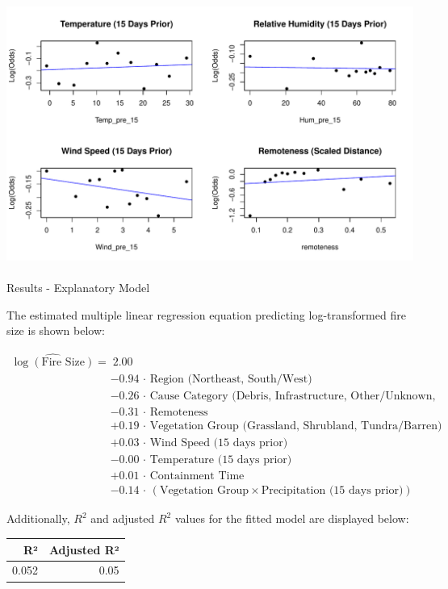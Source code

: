 \documentclass[
  letterpaper,
  DIV=11,
  numbers=noendperiod]{scrartcl}
\makeatletter
\let\oldparagraph\paragraph
\renewcommand{\paragraph}{
    \@ifstar
      \xxxParagraphStar
      \xxxParagraphNoStar
  }
\newcommand{\xxxParagraphStar}[1]{\oldparagraph*{#1}\mbox{}}
\newcommand{\xxxParagraphNoStar}[1]{\oldparagraph{#1}\mbox{}}
\makeatother
\begin{document}
\includegraphics{written-report_files/figure-pdf/unnamed-chunk-15-1.pdf}

\paragraph{Results - Explanatory
Model}\label{results---explanatory-model}

The estimated multiple linear regression equation predicting
log-transformed fire size is shown below:

\[
\begin{aligned}
\widehat{\log(\text{Fire Size})} =\ &\ 2.00 \\
&- 0.94\,\cdot\,\text{Region (Northeast, South/West)} \\
&- 0.26\,\cdot\,\text{Cause Category (Debris, Infrastructure, Other/Unknown, Recreational)} \\
&- 0.31\,\cdot\,\text{Remoteness} \\
&+ 0.19\,\cdot\,\text{Vegetation Group (Grassland, Shrubland, Tundra/Barren)} \\
&+ 0.03\,\cdot\,\text{Wind Speed (15 days prior)} \\
&- 0.00\,\cdot\,\text{Temperature (15 days prior)} \\
&+ 0.01\,\cdot\,\text{Containment Time} \\
&- 0.14\,\cdot\,(\text{Vegetation Group} \times \text{Precipitation (15 days prior)})
\end{aligned}
\]

Additionally, \(R^2\) and adjusted \(R^2\) values for the fitted model
are displayed below:

\begin{table}[!h]
\centering\begingroup\fontsize{7}{9}\selectfont

\begin{tabular}{rr}
\toprule
R² & Adjusted R²\\
\midrule
0.052 & 0.05\\
\bottomrule
\end{tabular}
\endgroup{}
\end{table}
\end{document}
